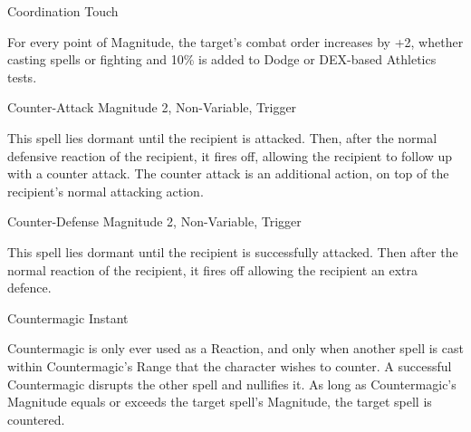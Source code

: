 \begin{rpg-spell}
{Coordination}
{Touch}

For every point of Magnitude, the target’s combat order increases by +2, whether casting spells or fighting and 10\% is added to Dodge or DEX-based Athletics tests. 
\end{rpg-spell}


\begin{rpg-spell}
{Counter-Attack}
{Magnitude 2, Non-Variable, Trigger}

This spell lies dormant until the recipient is attacked. Then, after the normal defensive reaction of the recipient, it fires off, allowing the recipient to follow up with a counter attack. The counter attack is an additional action, on top of the recipient’s normal attacking action.
\end{rpg-spell}


\begin{rpg-spell}
{Counter-Defense}
{Magnitude 2, Non-Variable, Trigger}

This spell lies dormant until the recipient is successfully attacked. Then after the normal reaction of the recipient, it fires off allowing the recipient an extra defence.
\end{rpg-spell}



\begin{rpg-spell}
{Countermagic}
{Instant}

Countermagic is only ever used as a Reaction, and only when another spell is cast within Countermagic’s Range that the character wishes to counter. A successful Countermagic disrupts the other spell and nullifies it. As long as Countermagic’s Magnitude equals or exceeds the target spell’s Magnitude, the target spell is countered.
\end{rpg-spell}


